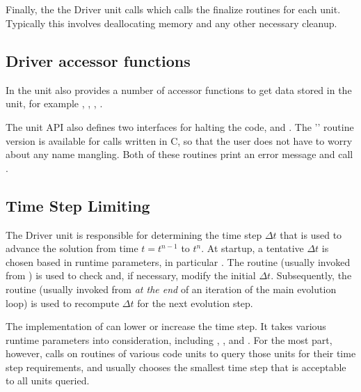 \subsection{}
Finally, the the \unit{Driver} unit calls  which calls the finalize routines for each unit.  Typically this involves deallocating memory and any other necessary cleanup.


\subsection{Driver accessor functions}
In \flashx the  unit also provides a number of
accessor functions to get data stored in the  unit, for
example ,  ,  
 ,  .


The  unit API also defines two interfaces for halting the code,
 and
\newline %
.
The '' routine
version is available for calls written in C, so that the user does not have to worry about
any name mangling.  Both of these routines print an error message and
call .


\subsection{Time Step Limiting}
The \unit{Driver} unit is responsible for determining the time step $\Delta t$
that is used to advance the solution from time $t=t^{n-1}$ to $t^n$.
At startup, a tentative $\Delta t$ is chosen based in runtime parameters,
in particular .
The routine  (usually invoked from ) is used to check and,
if necessary, modify the initial $\Delta t$.
Subsequently, the routine  (usually invoked from  {\em at the end}
of an iteration of the main evolution loop) is used to recompute $\Delta t$
for the next evolution step.

The implementation of  can lower or increase the
time step. It takes various runtime parameters into consideration,
including
,
, and
.
For the most part, however,  calls on
 routines of various code units to query those
units for their time step requirements, and usually chooses the smallest
time step that is acceptable to all units queried.

